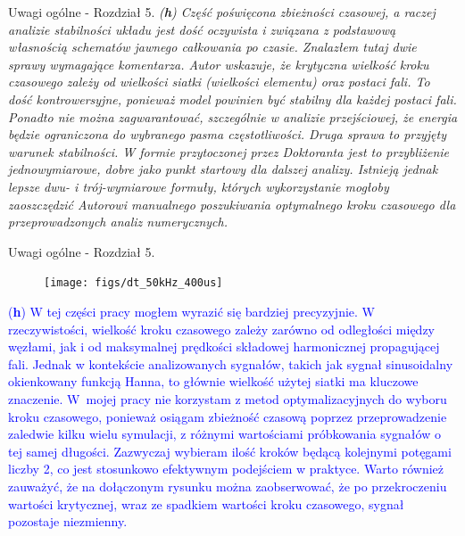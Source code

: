 \documentclass[10pt,aspectratio=169]{beamer} %
\begin{document}
\begin{frame}[label=frame20]{Uwagi ogólne - Rozdział 5.}\justifying
\textit{(\textbf{h}) Część poświęcona zbieżności czasowej, a raczej analizie stabilności układu jest dość oczywista i związana z podstawową własnością schematów jawnego całkowania po	czasie. Znalazłem tutaj dwie sprawy wymagające komentarza. Autor wskazuje, że krytyczna wielkość kroku czasowego zależy od wielkości siatki (wielkości elementu) oraz postaci fali. To dość kontrowersyjne, ponieważ model powinien być stabilny dla każdej postaci fali. Ponadto nie można zagwarantować, szczególnie w analizie przejściowej, że energia będzie ograniczona do wybranego pasma częstotliwości. Druga sprawa to przyjęty warunek stabilności. W formie przytoczonej przez Doktoranta jest to przybliżenie jednowymiarowe, dobre jako punkt startowy dla dalszej analizy. Istnieją jednak lepsze dwu- i trój-wymiarowe formuły, których wykorzystanie mogłoby zaoszczędzić Autorowi manualnego poszukiwania optymalnego kroku czasowego dla przeprowadzonych analiz numerycznych.}
\end{frame}
\begin{frame}[label=frame21]{Uwagi ogólne - Rozdział 5.}\justifying
	\begin{figure}
		\centering
		\texttt{[image: figs/dt\_50kHz\_400us]}
		\label{fig:conv_t}
	\end{figure}
\textcolor{blue}{(\textbf{h}) W tej części pracy mogłem wyrazić się bardziej precyzyjnie. W rzeczywistości, wielkość kroku czasowego zależy zarówno od odległości między węzłami, jak i od maksymalnej prędkości składowej harmonicznej propagującej fali. Jednak w kontekście analizowanych sygnałów, takich jak sygnał sinusoidalny okienkowany funkcją Hanna, to głównie wielkość użytej siatki ma kluczowe znaczenie.
W~mojej pracy nie korzystam z metod optymalizacyjnych do wyboru kroku czasowego, ponieważ osiągam zbieżność czasową poprzez przeprowadzenie zaledwie kilku wielu symulacji, z różnymi wartościami próbkowania sygnałów o tej samej długości. Zazwyczaj wybieram ilość kroków będącą kolejnymi potęgami liczby 2, co jest stosunkowo efektywnym podejściem w praktyce. Warto również zauważyć, że na dołączonym rysunku można zaobserwować, że po przekroczeniu wartości krytycznej, wraz ze spadkiem wartości kroku czasowego, sygnał pozostaje niezmienny.}
\end{frame}
\end{document}
